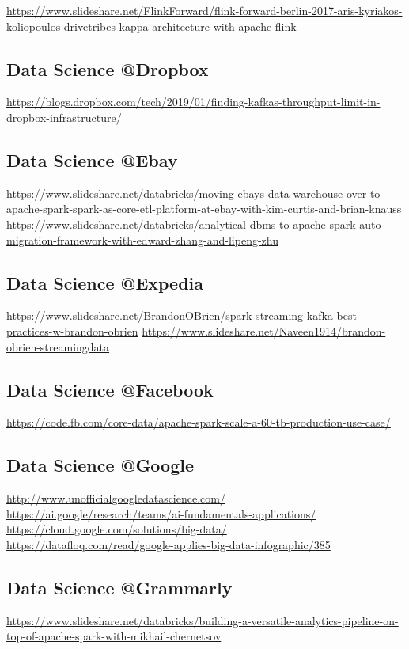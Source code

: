 \documentclass[12pt]{scrartcl} %
\begin{document}
\url{https://www.slideshare.net/FlinkForward/flink-forward-berlin-2017-aris-kyriakos-koliopoulos-drivetribes-kappa-architecture-with-apache-flink}

\subsection{Data Science @Dropbox}
\url{https://blogs.dropbox.com/tech/2019/01/finding-kafkas-throughput-limit-in-dropbox-infrastructure/}

\subsection{Data Science @Ebay}
\url{https://www.slideshare.net/databricks/moving-ebays-data-warehouse-over-to-apache-spark-spark-as-core-etl-platform-at-ebay-with-kim-curtis-and-brian-knauss}
\url{https://www.slideshare.net/databricks/analytical-dbms-to-apache-spark-auto-migration-framework-with-edward-zhang-and-lipeng-zhu}

\subsection{Data Science @Expedia}
\url{https://www.slideshare.net/BrandonOBrien/spark-streaming-kafka-best-practices-w-brandon-obrien}
\url{https://www.slideshare.net/Naveen1914/brandon-obrien-streamingdata}

\subsection{Data Science @Facebook}
\url{https://code.fb.com/core-data/apache-spark-scale-a-60-tb-production-use-case/}

\subsection{Data Science @Google}
\url{http://www.unofficialgoogledatascience.com/} \\
\url{https://ai.google/research/teams/ai-fundamentals-applications/} \\
\url{https://cloud.google.com/solutions/big-data/} \\
\url{https://datafloq.com/read/google-applies-big-data-infographic/385}

\subsection{Data Science @Grammarly}
\url{https://www.slideshare.net/databricks/building-a-versatile-analytics-pipeline-on-top-of-apache-spark-with-mikhail-chernetsov}
\end{document}
